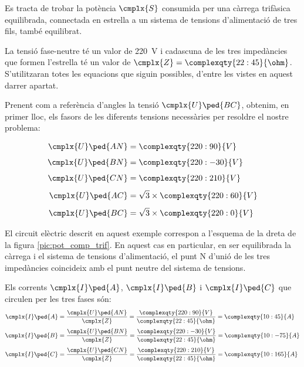 	
\begin{exemple}[\PotSistTresFils{}]
	\addcontentsxms{\PotSistTresFils}
    Es tracta de trobar la potència $\cmplx{S}$ consumida per una càrrega
    trifàsica equilibrada, connectada en estrella a un sistema de tensions
    d'alimentació  de tres fils, també equilibrat.

    La tensió fase-neutre
    té un valor de \qty{220}{V} i cadascuna de les tres  impedàncies
    que formen l'estrella té un valor de $\cmplx{Z}=\complexqty{22:45}{\ohm}$.
     S'utilitzaran totes les equacions que
    siguin possibles, d'entre les vistes en aquest darrer apartat.

    Prenent com a referència d'angles la tensió
    $\cmplx{U}\ped{BC}$, obtenim, en primer lloc, els fasors de
    les diferents tensions necessàries per resoldre el nostre
    problema:

    \hfill
    \begin{minipage}[b]{7.5cm}
        
    \end{minipage}
    \hfill
    \begin{minipage}[b][5.7cm][t]{3.8cm}
    \begin{align*}
        \cmplx{U}\ped{AN} &= \complexqty{220:90}{V} \\[1ex]
        \cmplx{U}\ped{BN} &= \complexqty{220:-30}{V} \\[1ex]
        \cmplx{U}\ped{CN} &= \complexqty{220:210}{V}\\[1ex]
        \cmplx{U}\ped{AC} &= \sqrt{3}\times \complexqty{220:60}{V} \\[1ex]
        \cmplx{U}\ped{BC} &= \sqrt{3}\times \complexqty{220:0}{V}
    \end{align*}
    \end{minipage}
    \hfill{}
    
	El circuit elèctric descrit en aquest exemple  correspon a
	l'esquema de la dreta de la figura \vref{pic:pot_comp_trif}. En
	aquest cas en particular, en ser equilibrada la càrrega i el
	sistema de tensions d'alimentació, el punt N d'unió de  les tres impedàncies coincideix amb el punt neutre del sistema de tensions.

    Els corrents $\cmplx{I}\ped{A}$, $\cmplx{I}\ped{B}$ i $\cmplx{I}\ped{C}$ que
    circulen  per les tres fases són:
    \begin{align*}
        \cmplx{I}\ped{A} &=\frac{\cmplx{U}\ped{AN}}{\cmplx{Z}} =
        \frac{\complexqty{220:90}{V}}{\complexqty{22:45}{\ohm}} =
        \complexqty{10:45}{A}\\[1mm]
        \cmplx{I}\ped{B} &=\frac{\cmplx{U}\ped{BN}}{\cmplx{Z}} =
        \frac{\complexqty{220:-30}{V}}{\complexqty{22:45}{\ohm}} =
        \complexqty{10:-75}{A}\\[1mm]
        \cmplx{I}\ped{C} &=\frac{\cmplx{U}\ped{CN}}{\cmplx{Z}} =
        \frac{\complexqty{220:210}{V}}{\complexqty{22:45}{\ohm}} =
        \complexqty{10:165}{A}
    \end{align*}



\end{exemple}
